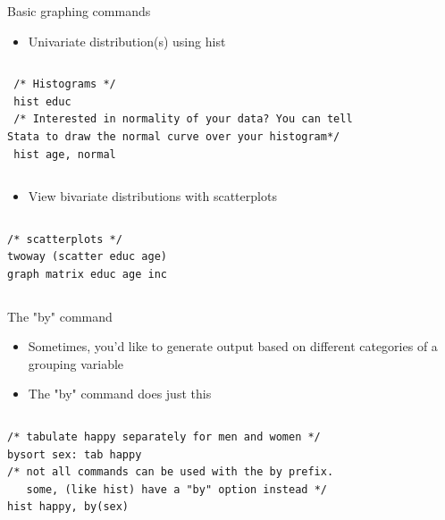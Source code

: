 \documentclass[table,smaller]{beamer}
\begin{document}
\begin{frame}[fragile,label=sec-3-2]{Basic graphing commands}
 \begin{itemize}
\item Univariate distribution(s) using \alert{hist}
\end{itemize}
\vspace{-.5em} \begin{columns}  \begin{block}{}
\begin{verbatim}
 /* Histograms */
 hist educ
 /* Interested in normality of your data? You can tell
Stata to draw the normal curve over your histogram*/
 hist age, normal
\end{verbatim}
\end{block} \end{columns}

\begin{itemize}
\item View bivariate distributions with scatterplots
\end{itemize}
\vspace{-.5em} \begin{columns}  \begin{block}{}
\begin{verbatim}
/* scatterplots */
twoway (scatter educ age)
graph matrix educ age inc
\end{verbatim}
\end{block} \end{columns}
\end{frame}
\begin{frame}[fragile,label=sec-3-3]{The "by" command}
 \begin{itemize}
\item Sometimes, you'd like to generate  output based on different categories of a grouping variable
\item The "by" command does just this
\end{itemize}

\vspace{-.5em} \begin{columns}  \begin{block}{}
\begin{verbatim}
/* tabulate happy separately for men and women */
bysort sex: tab happy
/* not all commands can be used with the by prefix.
   some, (like hist) have a "by" option instead */
hist happy, by(sex)
\end{verbatim}
\end{block} \end{columns}
\end{frame}
\end{document}
